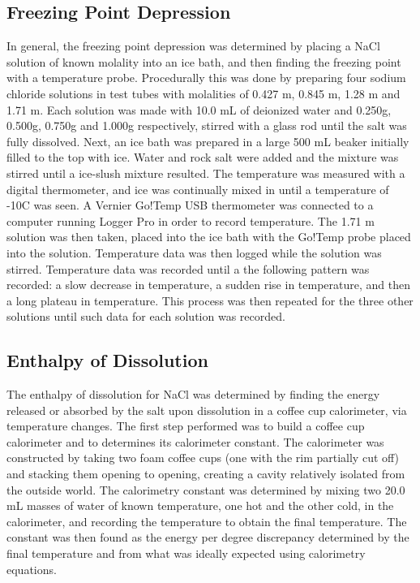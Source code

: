 \documentclass[12pt, letterpaper]{article}
\begin{document}
\subsection{Freezing Point Depression}
In general, the freezing point depression was determined by placing a NaCl solution of known molality into an ice bath, and then finding the freezing point with a temperature probe. Procedurally this was done by preparing four sodium chloride solutions in test tubes with molalities of  0.427 m, 0.845 m, 1.28 m and 1.71 m. Each solution was made with 10.0 mL of deionized water and 0.250g, 0.500g, 0.750g and 1.000g respectively, stirred with a glass rod until the salt was fully dissolved. Next, an ice bath was prepared in a large 500 mL beaker initially filled to the top with ice. Water and rock salt were added and the mixture was stirred until a ice-slush mixture resulted. The temperature was measured with a digital thermometer, and ice was continually mixed in until a temperature of -10\space\textdegree C was seen. A Vernier Go!Temp USB thermometer was connected to a computer running Logger Pro in order to record temperature. The 1.71 m solution was then taken, placed into the ice bath with the Go!Temp probe placed into the solution. Temperature data was then logged while the solution was stirred. Temperature data was recorded until a the following pattern was recorded: a slow decrease in temperature, a sudden rise in temperature, and then a long plateau in temperature. This process was then repeated for the three other solutions until such data for each solution was recorded.
\subsection{Enthalpy of Dissolution}
The enthalpy of dissolution for NaCl was determined by finding the energy released or absorbed by the salt upon dissolution in a coffee cup calorimeter, via temperature changes. The first step performed was to build a coffee cup calorimeter and to determines its calorimeter constant. The calorimeter was constructed by taking two foam coffee cups (one with the rim partially cut off) and stacking them opening to opening, creating a cavity relatively isolated from the outside world. The calorimetry constant was determined by mixing two 20.0 mL masses of water of known temperature, one hot and the other cold, in the calorimeter, and recording the temperature to obtain the final temperature. The constant was then found as the energy per degree discrepancy determined by the final temperature and from what was ideally expected using calorimetry equations.\\\par
\end{document}
